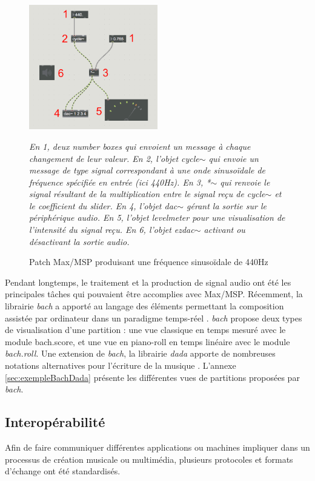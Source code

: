 \begin{figure}[H]
	\centering
	\includegraphics[keepaspectratio=true, width=0.5\textwidth]{OutilsInformatiques/i/exempleMax.png}
	\caption{Patch Max/MSP produisant une fréquence sinusoïdale de 440Hz}
	\label{fig:exempleMax}
	\small
	\it
	En 1, deux \emph{number boxes} qui envoient un message à chaque changement de leur valeur. En 2, l'objet \emph{cycle$\sim$} qui envoie un message de type signal correspondant à une onde sinusoïdale de fréquence spécifiée en entrée (ici 440Hz). En 3, \emph{*$\sim$} qui renvoie le signal résultant de la multiplication entre le signal reçu de \emph{cycle$\sim$} et le coefficient du slider. En 4, l'objet \emph{dac$\sim$} gérant la sortie sur le périphérique audio. En 5, l'objet \emph{levelmeter} pour une visualisation de l'intensité du signal reçu. En 6, l'objet \emph{ezdac$\sim$} activant ou désactivant la sortie audio.			
\end{figure}

 Pendant longtemps, le traitement et la production de signal audio ont été les principales tâches qui pouvaient être accomplies avec Max/MSP. Récemment, la librairie \textit{bach} a apporté au langage des éléments permettant la composition assistée par ordinateur dans un paradigme temps-réel \cite{agostini2013}. \textit{bach} propose deux types de visualisation d'une partition : une vue classique en temps mesuré avec le module bach.score, et une vue en piano-roll en temps linéaire avec le module \textit{bach.roll}. Une extension de \textit{bach}, la librairie \textit{dada} apporte de nombreuses notations alternatives pour l'écriture de la musique \cite{agostini2017}. L'annexe \ref{sec:exempleBachDada} présente les différentes vues de partitions proposées par \textit{bach}.   

\subsection{Interopérabilité}
\label{subsec:interoperabilite}
Afin de faire communiquer différentes applications ou machines impliquer dans un processus de création musicale ou multimédia, plusieurs protocoles et formats d'échange ont été standardisés.

